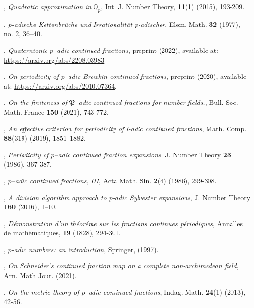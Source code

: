 \documentclass[12pt, reqno]{amsart}
\theoremstyle{plain}
\theoremstyle{definition}
\begin{document}
\begin{thebibliography}{}
,
\textit{Quadratic approximation in $\mathbb{Q}_p$},
\newblock Int. J. Number Theory, \textbf{11}(1) (2015), 193-209.

,
\textit{p-adische Kettenbr\"uche und Irrationalit\"at p-adischer},
\newblock Elem. Math. \textbf{32} (1977), no. 2, 36–40.

,
\textit{Quaternionic $p$--adic continued fractions},
\newblock preprint (2022), available at: \href{https://arxiv.org/abs/2208.03983}{https://arxiv.org/abs/2208.03983}

,
\textit{On periodicity of $p$--adic Browkin continued fractions},
\newblock preprint (2020), available at: \href{https://arxiv.org/abs/2010.07364}{https://arxiv.org/abs/2010.07364}.

,
\textit{On the finiteness of $\mathfrak{P}$--adic continued fractions for number fields.},
\newblock Bull. Soc. Math.
France \textbf{150} (2021), 743-772.

,
\textit{An effective criterion for periodicity of l-adic continued fractions},
\newblock Math. Comp. \textbf{88}(319) (2019), 1851–1882.

,
\textit{Periodicity of $p$--adic continued fraction expansions},
\newblock J. Number Theory \textbf{23} (1986), 367-387.

,
\textit{$p$--adic continued fractions, III},
\newblock Acta Math. Sin. \textbf{2}(4) (1986), 299-308.

, 
\textit{A division algorithm approach to $p$-adic Sylvester expansions}, 
\newblock J. Number Theory \textbf{160} (2016), 1–10.

,
\textit{Démonstration d'un théoréme sur les fractions continues périodiques},
\newblock Annalles de mathématiques, \textbf{19} (1828), 294-301.

,
\textit{$p$-adic numbers: an introduction},
\newblock Springer, (1997).

,
\textit{On Schneider’s continued fraction map on a complete non-archimedean field},
\newblock Arn. Math Jour. (2021).

,
\textit{On the metric theory of $p$--adic continued fractions},
\newblock Indag. Math. \textbf{24}(1) (2013), 42-56.


\end{thebibliography}
\end{document}

